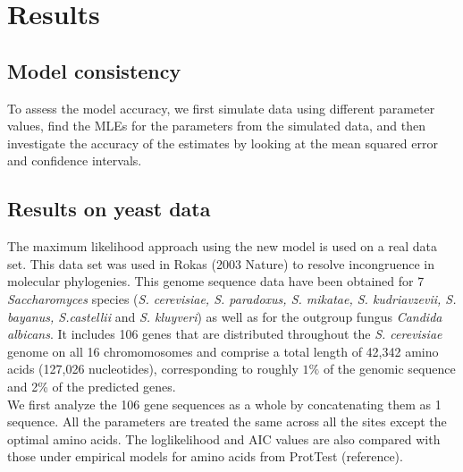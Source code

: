 \documentclass[13pt]{article}
\begin{document}
\section{Results}
\subsection{Model consistency}
To assess the model accuracy, we first simulate data using different parameter values, find the MLEs for the parameters from the simulated data, and then investigate the accuracy of the estimates by looking at the mean squared error and confidence intervals.\\


\subsection{Results on yeast data}
The maximum likelihood approach using the new model is used on a real data set. This data set was used in Rokas (2003 Nature) to resolve incongruence in molecular phylogenies. This genome sequence data have been obtained for 7 {\it Saccharomyces} species ({\it S. cerevisiae, S. paradoxus, S. mikatae, S. kudriavzevii, S. bayanus, S.castellii} and {\it S. kluyveri}) as well as for the outgroup fungus {\it Candida albicans}. It includes 106 genes that are distributed throughout the {\it S. cerevisiae} genome on all 16 chromomosomes and comprise a total length of 42,342 amino acids (127,026 nucleotides), corresponding to roughly $1\%$ of the genomic sequence and 2\% of the predicted genes. \\

We first analyze the 106 gene sequences as a whole by concatenating them as 1 sequence. All the parameters are treated the same across all the sites except the optimal amino acids. The loglikelihood and AIC values are also compared with those under empirical models for amino acids from ProtTest (reference). \\
\end{document}
